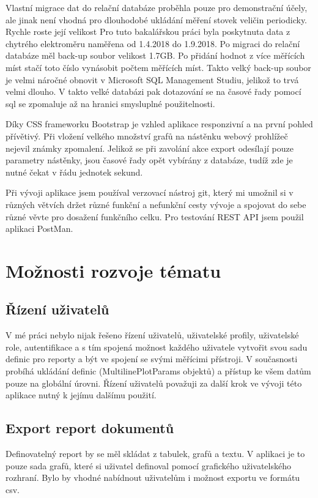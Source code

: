 \documentclass[FM,BP]{tulthesis}
\begin{document}
        Vlastní migrace dat do relační databáze proběhla pouze pro demonstrační účely, 
        ale jinak není vhodná pro dlouhodobé ukládání měření stovek veličin periodicky. 
        Rychle roste její velikost
        Pro tuto bakalářskou práci byla poskytnuta data z chytrého elektroměru naměřena od 1.4.2018 do 1.9.2018. 
        Po migraci do relační databáze měl back-up soubor velikost 1.7GB. 
        Po přidání hodnot z více měřících míst stačí toto číslo vynásobit počtem měřících míst.
        Takto velký back-up soubor je velmi náročné obnovit v Microsoft SQL Management Studiu, jelikož to trvá velmi dlouho.
        V takto velké databázi pak dotazování se na časové řady pomocí sql se zpomaluje až na hranici smysluplné použitelnosti. 

        Díky CSS frameworku Bootstrap je vzhled aplikace responzivní a na první pohled přívětivý. 
        Při vložení velkého množství grafů na nástěnku webový prohlížeč nejevil známky zpomalení.
        Jelikož se při zavolání akce export odesílají pouze parametry nástěnky, jsou časové řady opět vybírány z databáze, 
        tudíž zde je nutné čekat v řádu jednotek sekund.

        Při vývoji aplikace jsem používal verzovací nástroj git, 
        který mi umožnil si v různých větvích držet různé funkční a nefunkční cesty vývoje 
        a spojovat do sebe různé věvte pro dosažení funkčního celku. \cite{27}
        Pro testování REST API jsem použil aplikaci PostMan. \cite{26}

    \section{Možnosti rozvoje tématu}
        \subsection*{Řízení uživatelů}
            V mé práci nebylo nijak řešeno řízení uživatelů, uživatelské profily, uživatelské role, autentifikace 
            a s tím spojená možnost každého uživatele vytvořit svou sadu definic pro reporty a být ve spojení se svými měřícimi přístroji.
            V současnosti probíhá ukládání definic (MultilinePlotParams objektů) a přístup ke všem datům pouze na globální úrovni.
            Řízení uživatelů považuji za další krok ve vývoji této aplikace nutný k jejímu dalšímu použití.
            
        \subsection*{Export report dokumentů}
            Definovatelný report by se měl skládat z tabulek, grafů a textu. 
            V aplikaci je to pouze sada grafů, které si uživatel definoval pomocí grafického uživatelského rozhraní.
            Bylo by vhodné nabídnout uživatelům i možnost exportu ve formátu csv.
\end{document}
